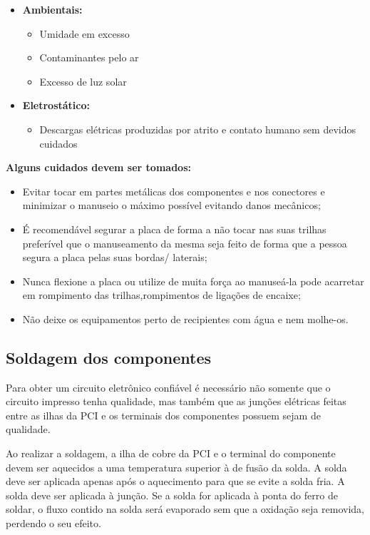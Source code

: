\begin{itemize}
\item \textbf{Ambientais:}
\begin{itemize}
\item Umidade em excesso
\item Contaminantes pelo ar 
\item Excesso de luz solar
\end{itemize}
\end{itemize}

\begin{itemize}
\item \textbf{Eletrostático:}
\begin{itemize}
\item Descargas elétricas produzidas por atrito e contato humano sem devidos cuidados
\end{itemize}
\end{itemize}

\par {\textbf{Alguns cuidados devem ser tomados:}}

\begin{itemize}
\item Evitar tocar em partes metálicas dos componentes e nos conectores e minimizar o manuseio o máximo possível evitando danos mecânicos;
\item É recomendável segurar a placa de forma a não tocar nas suas trilhas preferível que o manuseamento da mesma seja feito de forma que a pessoa segura a placa pelas suas bordas/ laterais;  

\item Nunca flexione a placa ou utilize de muita força ao manuseá-la pode acarretar em rompimento das trilhas,rompimentos de ligações  de encaixe;

\item Não deixe os equipamentos perto de recipientes com água e nem molhe-os.
\end{itemize}

\subsection{Soldagem dos componentes}

\PAR Para obter um circuito eletrônico confiável é necessário não somente que o circuito impresso tenha qualidade, mas também que as junções elétricas feitas entre as ilhas da PCI e os terminais dos componentes possuem sejam de qualidade.

Ao realizar a soldagem, a ilha de cobre da PCI e o terminal do componente devem ser aquecidos a uma temperatura superior à de fusão da solda. A solda deve ser aplicada apenas após o aquecimento para que se evite a solda fria. A solda deve ser aplicada à junção. Se a solda for aplicada à ponta do ferro de soldar, o fluxo contido na solda será evaporado sem que a oxidação seja removida, perdendo o seu efeito.

